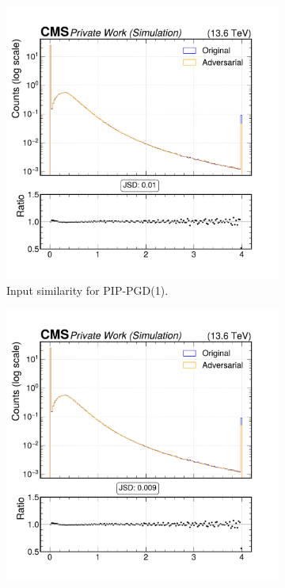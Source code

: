 \begin{figure}[h]
  \centering
  \begin{subfigure}[t]{0.32\textwidth}
    \includegraphics[width=\linewidth]{media/output/features/compare/combined_it_1/cmp_cpf_arr_Cpfcan_BtagPf_trackPtRel.pdf}
    \caption*{Input similarity for PIP-PGD(1).}
  \end{subfigure}\hfill
  \begin{subfigure}[t]{0.32\textwidth}
    \includegraphics[width=\linewidth]{media/output/features/compare/combined_it_2/cmp_cpf_arr_Cpfcan_BtagPf_trackPtRel.pdf}

\end{subfigure}
\end{figure}

